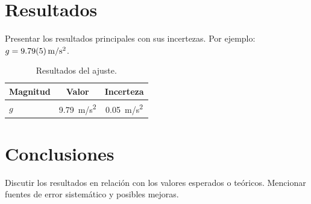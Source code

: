\documentclass[12pt, a4paper]{article}
\begin{document}
\section{Resultados}

Presentar los resultados principales con sus incertezas.
Por ejemplo: $g = \SI{9.79 \pm 0.05}{m/s^2}$.

\begin{table}[H]
    \centering
    \caption{Resultados del ajuste.}
    \label{tab:resultados}
    \begin{tabular}{lcc}
        \toprule
        Magnitud & Valor & Incerteza \\
        \midrule
        $g$ & \SI{9.79}{m/s^2} & \SI{0.05}{m/s^2} \\
        \bottomrule
    \end{tabular}
\end{table}

\section{Conclusiones}

Discutir los resultados en relación con los valores esperados o teóricos.
Mencionar fuentes de error sistemático y posibles mejoras.

\printbibliography
\end{document}
